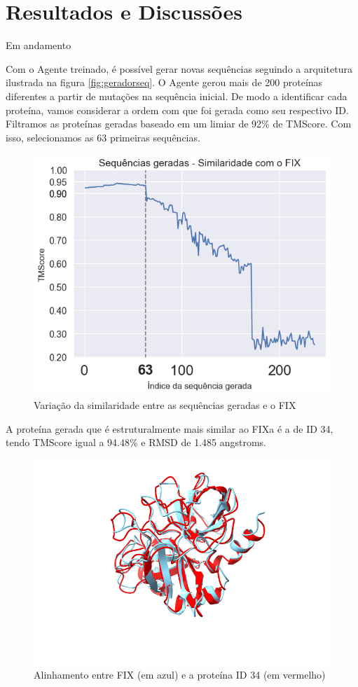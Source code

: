 \chapter{Resultados e Discussões}

{\color{red} Em andamento}

Com o Agente treinado, é possível gerar novas sequências seguindo a arquitetura 
ilustrada na figura \ref{fig:geradorseq}. 
O Agente gerou mais de 200 proteínas diferentes a partir de mutações na sequência inicial. 
De modo a identificar cada proteína, 
vamos considerar a ordem com que foi gerada como seu respectivo ID.
Filtramos as proteínas geradas baseado em um limiar de 92\% de TMScore.
Com isso, selecionamos as 63 primeiras sequências.  

\begin{figure}[H]
    \centering
    \includegraphics[width=.6\linewidth]{figuras/plot_tmscore_decreasing.png}    
    \caption{Variação da similaridade entre as sequências geradas e o FIX }
    \label{fig:tmscore_decreasing}
  \end{figure}


A proteína gerada que é estruturalmente mais similar ao FIXa é a de ID 34,
tendo TMScore igual a 94.48\% e RMSD de 1.485 angstroms. 

\begin{figure}[H]
    \centering
    \includegraphics[width=.6\linewidth]{figuras/FIXvsID34.png}    
    \caption{Alinhamento entre FIX (em azul) e a proteína ID 34 (em vermelho)}
    \label{fig:FIX_vs_ID34}
\end{figure}


